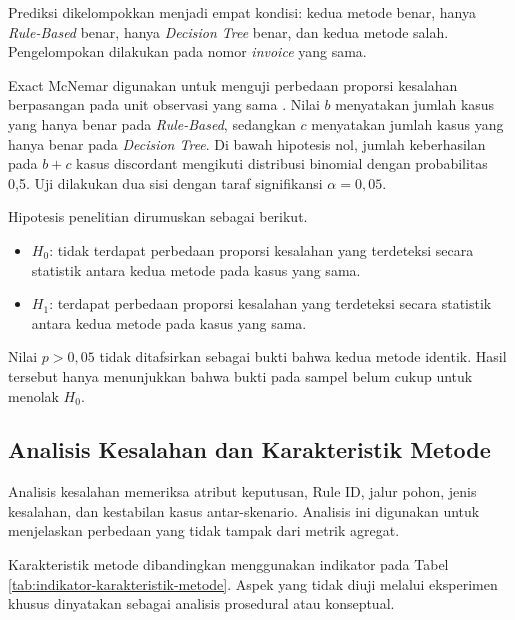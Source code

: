 Prediksi dikelompokkan menjadi empat kondisi: kedua metode benar, hanya \textit{Rule-Based} benar, hanya \textit{Decision Tree} benar, dan kedua metode salah. Pengelompokan dilakukan pada nomor \textit{invoice} yang sama.

Exact McNemar digunakan untuk menguji perbedaan proporsi kesalahan berpasangan pada unit observasi yang sama \cite{McNemar1947,RainioEtAl2024}. Nilai $b$ menyatakan jumlah kasus yang hanya benar pada \textit{Rule-Based}, sedangkan $c$ menyatakan jumlah kasus yang hanya benar pada \textit{Decision Tree}. Di bawah hipotesis nol, jumlah keberhasilan pada $b+c$ kasus discordant mengikuti distribusi binomial dengan probabilitas 0,5. Uji dilakukan dua sisi dengan taraf signifikansi $\alpha=0{,}05$.

Hipotesis penelitian dirumuskan sebagai berikut.

\begin{itemize}
    \item $H_0$: tidak terdapat perbedaan proporsi kesalahan yang terdeteksi secara statistik antara kedua metode pada kasus yang sama.
    \item $H_1$: terdapat perbedaan proporsi kesalahan yang terdeteksi secara statistik antara kedua metode pada kasus yang sama.
\end{itemize}

Nilai $p>0{,}05$ tidak ditafsirkan sebagai bukti bahwa kedua metode identik. Hasil tersebut hanya menunjukkan bahwa bukti pada sampel belum cukup untuk menolak $H_0$.

\subsection{Analisis Kesalahan dan Karakteristik Metode}

Analisis kesalahan memeriksa atribut keputusan, Rule ID, jalur pohon, jenis kesalahan, dan kestabilan kasus antar-skenario. Analisis ini digunakan untuk menjelaskan perbedaan yang tidak tampak dari metrik agregat.

Karakteristik metode dibandingkan menggunakan indikator pada Tabel \ref{tab:indikator-karakteristik-metode}. Aspek yang tidak diuji melalui eksperimen khusus dinyatakan sebagai analisis prosedural atau konseptual.

